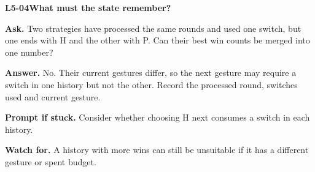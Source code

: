 \documentclass[11pt,a4paper]{article}
\begin{document}
\noindent\begin{minipage}{\textwidth}
{\color{teal}\textbf{L5-04}}\quad \textbf{What must the state remember?}\par\smallskip
\textbf{Ask.} Two strategies have processed the same rounds and used one switch, but one ends with H and the other with P. Can their best win counts be merged into one number?\par\smallskip
\textbf{Answer.} No. Their current gestures differ, so the next gesture may require a switch in one history but not the other. Record the processed round, switches used and current gesture.\par\smallskip
\textbf{Prompt if stuck.} Consider whether choosing H next consumes a switch in each history.\par\smallskip
\textbf{Watch for.} A history with more wins can still be unsuitable if it has a different gesture or spent budget.
\end{minipage}\par{}\medskip
\end{document}
